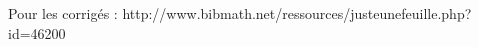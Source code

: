 



\vspace{1em}

Pour les corrigés : http://www.bibmath.net/ressources/justeunefeuille.php?id=46200 

